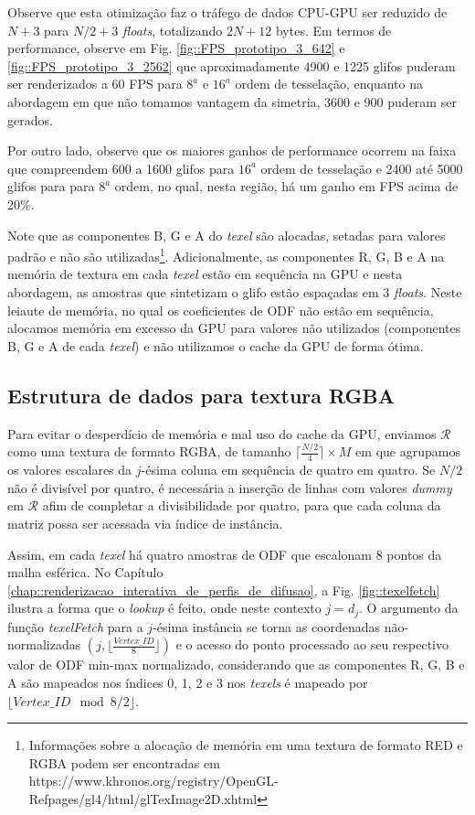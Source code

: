 \documentclass[
    12pt,                %
    oneside,            %
    a4paper,            %
    english,            %
    french,                %
    spanish,            %
    brazil                %
    ]{abntex2}
\begin{document}
Observe que esta otimização faz o tráfego de dados CPU-GPU ser reduzido de $N + 3$ para $N/2 + 3$ \textit{floats}, totalizando $2N + 12$ bytes. Em termos de performance, observe em Fig. \ref{fig::FPS_prototipo_3_642} e \ref{fig::FPS_prototipo_3_2562} que aproximadamente 4900 e 1225 glifos puderam ser renderizados a 60 FPS para $8^a$ e $16^a$ ordem de tesselação, enquanto na abordagem em que não tomamos vantagem da simetria, 3600 e 900 puderam ser gerados.

Por outro lado, observe que os maiores ganhos de performance ocorrem na faixa que compreendem 600 a 1600 glifos para $16^a$ ordem de tesselação e 2400 até 5000 glifos para para $8^a$ ordem, no qual, nesta região, há um ganho em FPS acima de 20\%.

Note que as componentes B, G e A do \textit{texel} são alocadas, setadas para valores padrão e não são utilizadas\footnote{Informações sobre a alocação de memória em uma textura de formato RED e RGBA podem ser encontradas em https://www.khronos.org/registry/OpenGL-Refpages/gl4/html/glTexImage2D.xhtml}. Adicionalmente, as componentes R, G, B e A na memória de textura em cada \textit{texel} estão em sequência na GPU e nesta abordagem, as amostras que sintetizam o glifo estão espaçadas em 3 \textit{floats}. Neste leiaute de memória, no qual os coeficientes de ODF não estão em sequência, alocamos memória em excesso da GPU para valores não utilizados (componentes B, G e A de cada \textit{texel}) e não utilizamos o cache da GPU de forma ótima.



\subsection{Estrutura de dados para textura RGBA}
\label{sec::estrutura_de_dados_para_textura_RGBA}

Para evitar o desperdício de memória e mal uso do cache da GPU, enviamos $\boldsymbol{\mathscr{R}}$ como uma textura de formato RGBA, de tamanho $\lceil \frac{N/2}{4}\rceil \times M$ em que agrupamos os valores escalares da $j$-ésima coluna em sequência de quatro em quatro. Se $N/2$ não é divisível por quatro, é necessária a inserção de linhas com valores \textit{dummy} em $\boldsymbol{\mathscr{R}}$ afim de completar a divisibilidade por quatro, para que cada coluna da matriz possa ser acessada via índice de instância.

Assim, em cada \textit{texel} há quatro amostras de ODF que escalonam 8 pontos da malha esférica. No Capítulo \ref{chap::renderizacao_interativa_de_perfis_de_difusao}, a Fig. \ref{fig::texelfetch} ilustra a forma que o \textit{lookup} é feito, onde neste contexto $j = d_j$. O argumento da função \textit{texelFetch} para a $j$-ésima instância se torna as coordenadas não-normalizadas $(j, \lfloor \frac{Vertex\_ID}{8} \rfloor)$ e o acesso do ponto processado ao seu respectivo valor de ODF min-max normalizado, considerando que as componentes R, G, B e A são mapeados nos índices 0, 1, 2 e 3 nos \textit{texels} é mapeado por $\lfloor Vertex\_ID \mod{8}/2 \rfloor$.
\end{document}

